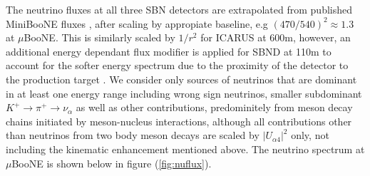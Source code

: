 \documentclass[11pt, a4paper]{article}
\begin{document}
The neutrino fluxes at all three SBN detectors are extrapolated from published MiniBooNE fluxes \cite{AguilarArevalo:2008y}, after scaling by appropiate baseline, e.g $(470/540)^2 \approx 1.3$ at $\mu$BooNE. This is similarly scaled by $1/r^2$ for ICARUS at 600m, however, an additional energy dependant flux modifier is applied for SBND at 110m to account for the softer energy spectrum due to the proximity of the detector to the production target \cite{Antonello:2015lea}. We consider only sources of neutrinos that are dominant in at least one energy range including wrong sign neutrinos, smaller subdominant $K^+\rightarrow \pi^+\rightarrow \nu_\alpha$ as well as other contributions, predominitely from meson decay chains initiated by meson-nucleus interactions, although all contributions other than neutrinos from two body meson decays are scaled by $|U_{\alpha 4}|^2$ only, not including the kinematic enhancement mentioned above. The neutrino spectrum at $\mu$BooNE is shown below in figure (\ref{fig:nuflux}). 
\end{document}
